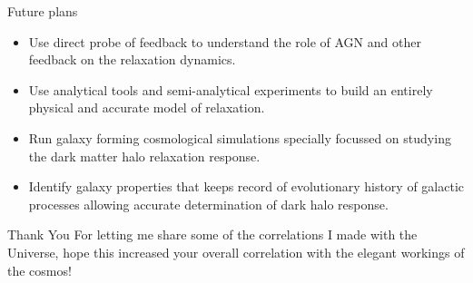 \documentclass[11pt]{beamer}
\begin{document}
\begin{frame}{Future plans}
    \begin{itemize}
        \item Use direct probe of feedback to understand the role of AGN and other feedback on the relaxation dynamics.
        \item Use analytical tools and semi-analytical experiments to build an entirely physical and accurate model of relaxation.
        \item Run galaxy forming cosmological simulations specially focussed on studying the dark matter halo relaxation response.
        \item Identify galaxy properties that keeps record of evolutionary history of galactic processes allowing accurate determination of dark halo response.
    \end{itemize} \pause
    \begin{block}{Thank You}
        For letting me share some of the correlations I made with the Universe, hope this increased your overall correlation with the elegant workings of the cosmos!
    \end{block}
\end{frame}


\end{document}
